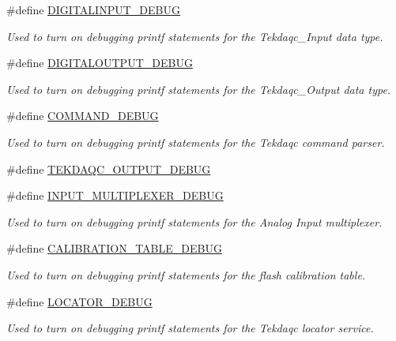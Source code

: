 \begin{DoxyCompactItemize}
\#define \hyperlink{group__driver__debug_ga55c5160d7e5641765d73e59bbdd8a004}{D\-I\-G\-I\-T\-A\-L\-I\-N\-P\-U\-T\-\_\-\-D\-E\-B\-U\-G}
\begin{DoxyCompactList}\small\item\em Used to turn on debugging {\ttfamily printf} statements for the Tekdaqc\-\_\-\-Input data type. \end{DoxyCompactList}\item 
\#define \hyperlink{group__driver__debug_ga1639893611d8bcb513a7200e74f36267}{D\-I\-G\-I\-T\-A\-L\-O\-U\-T\-P\-U\-T\-\_\-\-D\-E\-B\-U\-G}
\begin{DoxyCompactList}\small\item\em Used to turn on debugging {\ttfamily printf} statements for the Tekdaqc\-\_\-\-Output data type. \end{DoxyCompactList}\item 
\#define \hyperlink{group__driver__debug_ga4271519e9ee5565b70175ae766253c65}{C\-O\-M\-M\-A\-N\-D\-\_\-\-D\-E\-B\-U\-G}
\begin{DoxyCompactList}\small\item\em Used to turn on debugging {\ttfamily printf} statements for the Tekdaqc command parser. \end{DoxyCompactList}\item 
\#define \hyperlink{group__driver__debug_ga554ddb4cbcade037bed480f30c6ecb10}{T\-E\-K\-D\-A\-Q\-C\-\_\-\-O\-U\-T\-P\-U\-T\-\_\-\-D\-E\-B\-U\-G}
\item 
\#define \hyperlink{group__driver__debug_ga0db08719cee028109f27c3989a8397cb}{I\-N\-P\-U\-T\-\_\-\-M\-U\-L\-T\-I\-P\-L\-E\-X\-E\-R\-\_\-\-D\-E\-B\-U\-G}
\begin{DoxyCompactList}\small\item\em Used to turn on debugging {\ttfamily printf} statements for the Analog Input multiplexer. \end{DoxyCompactList}\item 
\#define \hyperlink{group__driver__debug_ga57d09f84cedce67724b4aa23f2778c8f}{C\-A\-L\-I\-B\-R\-A\-T\-I\-O\-N\-\_\-\-T\-A\-B\-L\-E\-\_\-\-D\-E\-B\-U\-G}
\begin{DoxyCompactList}\small\item\em Used to turn on debugging {\ttfamily printf} statements for the flash calibration table. \end{DoxyCompactList}\item 
\#define \hyperlink{group__driver__debug_gad565c3e1604db6f3110eafa8b0c71f39}{L\-O\-C\-A\-T\-O\-R\-\_\-\-D\-E\-B\-U\-G}
\begin{DoxyCompactList}\small\item\em Used to turn on debugging {\ttfamily printf} statements for the Tekdaqc locator service. \end{DoxyCompactList}\item 

\end{DoxyCompactItemize}
